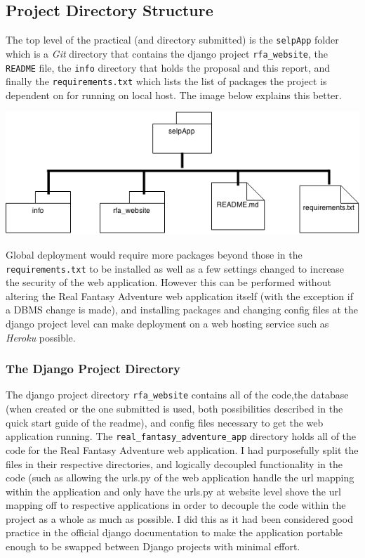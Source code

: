 \documentclass[11pt,a4paper]{article}
\begin{document}
\subsection{Project Directory Structure}
The top level of the practical (and directory submitted) is the \verb|selpApp| folder which is a \textit{Git} directory that contains the django project \verb|rfa_website|, the \verb|README| file, the \verb|info| directory that holds the proposal and this report, and finally the \verb|requirements.txt| which lists the list of packages the project is dependent on for running on local host. The image below explains this better.

\begin{center}
\includegraphics[scale=0.5]{selpProjectStructure.png} \\
\end{center}

Global deployment would require more packages beyond those in the \verb|requirements.txt| to be installed as well as a few settings changed to increase the security of the web application. However this can be performed without altering the Real Fantasy Adventure web application itself (with the exception if a DBMS change is made), and installing packages and changing config files at the django project level can make deployment on a web hosting service such as \textit{Heroku} possible.

\subsubsection{The Django Project Directory}
The django project directory \verb|rfa_website| contains all of the code,the database (when created or the one submitted is used, both possibilities described in the quick start guide of the readme), and config files necessary to get the web application running. The \verb|real_fantasy_adventure_app| directory holds all of the code for the Real Fantasy Adventure web application. I had purposefully split the files in their respective directories, and logically decoupled functionality in the code (such as allowing the urls.py of the web application handle the url mapping within the application and only have the urls.py at website level shove the url mapping off to respective applications in order to decouple the code within the project as a whole as much as possible. I did this as it had been considered good practice in the official django documentation to make the application portable enough to be swapped between Django projects with minimal effort.
\end{document}
